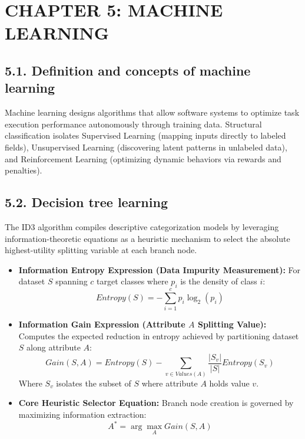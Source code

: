 \documentclass[../main.tex]{subfiles}
\begin{document}

\section{CHAPTER 5: MACHINE LEARNING}

\subsection{5.1. Definition and concepts of machine learning}
Machine learning designs algorithms that allow software systems to optimize task execution performance autonomously through training data. Structural classification isolates Supervised Learning (mapping inputs directly to labeled fields), Unsupervised Learning (discovering latent patterns in unlabeled data), and Reinforcement Learning (optimizing dynamic behaviors via rewards and penalties).

\subsection{5.2. Decision tree learning}
The ID3 algorithm compiles descriptive categorization models by leveraging information-theoretic equations as a heuristic mechanism to select the absolute highest-utility splitting variable at each branch node.
\begin{itemize}
    \item \textbf{Information Entropy Expression (Data Impurity Measurement):} For dataset $S$ spanning $c$ target classes where $p_i$ is the density of class $i$:
    \begin{equation}
        Entropy(S) = - \sum_{i=1}^{c} p_i \log_2(p_i)
    \end{equation}
    \item \textbf{Information Gain Expression (Attribute $A$ Splitting Value):} Computes the expected reduction in entropy achieved by partitioning dataset $S$ along attribute $A$:
    \begin{equation}
        Gain(S, A) = Entropy(S) - \sum_{v \in Values(A)} \frac{|S_v|}{|S|} Entropy(S_v)
    \end{equation}
    Where $S_v$ isolates the subset of $S$ where attribute $A$ holds value $v$.
    \item \textbf{Core Heuristic Selector Equation:} Branch node creation is governed by maximizing information extraction:
    \begin{equation}
        A^* = \arg\max_{A} Gain(S, A)
    \end{equation}
\end{itemize}
\end{document}
